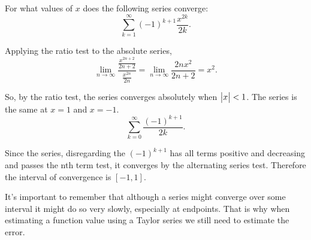 \begin{example}
	For what values of $x$ does the following series converge:
	\begin{equation*}
		\sum_{k=1}^{\infty}{(-1)^{k+1}\frac{x^{2k}}{2k}}.
	\end{equation*}
\end{example}
\begin{answer}
	Applying the ratio test to the absolute series,
	\begin{equation*}
		\lim_{n\to\infty}{\frac{\frac{x^{2n+2}}{2n+2}}{\frac{x^{2n}}{2n}}} = \lim_{n\to\infty}{\frac{2nx^2}{2n+2}} = x^2.
	\end{equation*}

	So, by the ratio test, the series converges absolutely when $\big\lvert x \big\rvert<1$.
	The series is the same at $x=1$ and $x=-1$.
	\begin{equation*}
		\sum_{k=0}^{\infty}{\frac{(-1)^{k+1}}{2k}}.
	\end{equation*}

	Since the series, disregarding the $(-1)^{k+1}$ has all terms positive and decreasing and passes the nth term test, it converges by the alternating series test.
	Therefore the interval of convergence is $[-1,1]$.
\end{answer}

It's important to remember that although a series might converge over some interval it might do so very slowly, especially at endpoints.
That is why when estimating a function value using a Taylor series we still need to estimate the error.